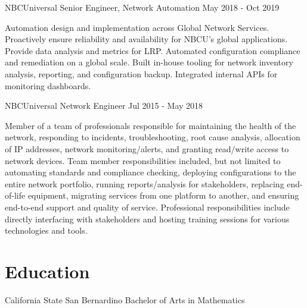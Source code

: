 \documentclass[letterpaper,11pt]{article}
\begin{document}
NBCUniversal Senior Engineer, Network Automation May 2018 - Oct 2019

Automation design and implementation across Global Network Services.
Proactively ensure reliability and availability for NBCU's global applications.
Provide data analysis and metrics for LRP.
Automated configuration compliance and remediation on a global scale.
Built in-house tooling for network inventory analysis, reporting, and configuration backup.
Integrated internal APIs for monitoring dashboards.

NBCUniversal Network Engineer Jul 2015 - May 2018

Member of a team of professionals responsible for maintaining the health of the network, responding to 
incidents, troubleshooting, root cause analysis, allocation of IP addresses, network monitoring/alerts, 
and granting read/write access to network devices.
Team member responsibilities included, but not limited to automating standards and compliance checking, 
deploying configurations to the entire network portfolio, running reports/analysis for stakeholders, 
replacing end-of-life equipment, migrating services from one platform to another, and ensuring end-to-end 
support and quality of service.
Professional responsibilities include directly interfacing with stakeholders and hosting training sessions 
for various technologies and tools.

\section{Education}

California State San Bernardino
Bachelor of Arts in Mathematics
\end{document}
